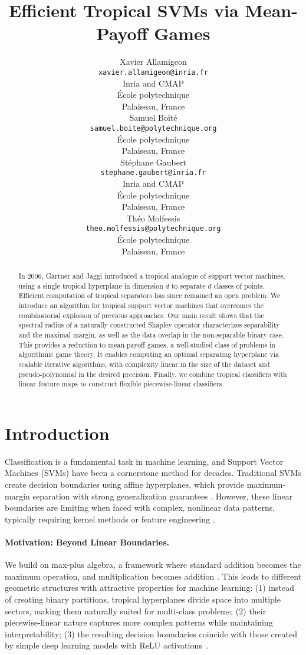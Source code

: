 \documentclass{article}
\title{Efficient Tropical SVMs via Mean-Payoff Games}
\author{
  Xavier Allamigeon \\
  {\small\tt xavier.allamigeon@inria.fr}\\
  Inria and CMAP \\
  École polytechnique \\
  Palaiseau, France \\
  \And
  Samuel Boïté \\
  {\small\tt samuel.boite@polytechnique.org}\\
  École polytechnique \\
  Palaiseau, France \\
  \And
  Stéphane Gaubert \\
  {\small\tt stephane.gaubert@inria.fr}\\
  Inria and CMAP \\
  École polytechnique \\
  Palaiseau, France \\
  \And
  Théo Molfessis \\
  {\small\tt theo.molfessis@polytechnique.org}\\
  École polytechnique \\
  Palaiseau, France \\
}
\begin{document}
\maketitle
\begin{abstract}
    In 2006, Gärtner and Jaggi introduced a tropical analogue of support vector machines, using a single tropical hyperplane in dimension $d$ to separate $d$ classes of points.
    Efficient computation of tropical separators has since remained an open problem. We introduce an algorithm for tropical support vector machines that overcomes the combinatorial explosion of previous approaches.
    Our main result shows that the spectral radius of a naturally constructed Shapley operator characterizes separability and the maximal margin, as well as the data overlap in the non-separable binary case.
    This provides a reduction to mean-payoff games, a well-studied class of problems in algorithmic game theory. It enables computing an optimal separating hyperplane via scalable iterative algorithms, with complexity linear in the size of the dataset and pseudo-polynomial in the desired precision.
    Finally, we combine tropical classifiers with linear feature maps to construct flexible piecewise-linear classifiers.
\end{abstract}

\section{Introduction}\label{sec:intro}

Classification is a fundamental task in machine learning, and Support Vector Machines (SVMs) have been a cornerstone method for decades. Traditional SVMs create decision boundaries using affine hyperplanes, which provide maximum-margin separation with strong generalization guarantees \cite{vapnik1999}. However, these linear boundaries are limiting when faced with complex, nonlinear data patterns, typically requiring kernel methods or feature engineering \cite{scholkopf2002}.

\paragraph{Motivation: Beyond Linear Boundaries.} We build on max-plus algebra, a framework where standard addition becomes the maximum operation, and multiplication becomes addition \cite{maclagan2015}. This leads to different geometric structures with attractive properties for machine learning: (1) instead of creating binary partitions, tropical hyperplanes divide space into multiple sectors, making them naturally suited for multi-class problems; (2) their piecewise-linear nature captures more complex patterns while maintaining interpretability; (3) the resulting decision boundaries coincide with those created by simple deep learning models with ReLU activations~\cite{zhang2018}.
\end{document}
